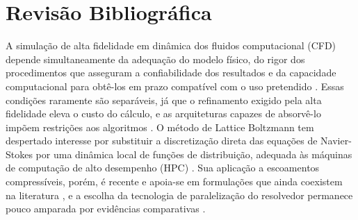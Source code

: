 
\chapter[Revisão Bibliográfica]{Revisão Bibliográfica}\label{ch:revisao-bibliografica}






A simulação de alta fidelidade em dinâmica dos fluidos computacional (CFD) depende simultaneamente da adequação do modelo físico, do rigor dos procedimentos que asseguram a confiabilidade dos resultados e da capacidade computacional para obtê-los em prazo compatível com o uso pretendido \parencite{Moin2011, Oberkampf2010}.
Essas condições raramente são separáveis, já que o refinamento exigido pela alta fidelidade eleva o custo do cálculo, e as arquiteturas capazes de absorvê-lo impõem restrições aos algoritmos \parencite{Karp2025, Kolla2018}.
O método de Lattice Boltzmann tem despertado interesse por substituir a discretização direta das equações de Navier-Stokes por uma dinâmica local de funções de distribuição, adequada às máquinas de computação de alto desempenho (HPC) \parencite{Chen1998, Succi2001, Tomczak2021}.
Sua aplicação a escoamentos compressíveis, porém, é recente e apoia-se em formulações que ainda coexistem na literatura \parencite{Tran2022, Rathnayake2024, Coreixas2017}, e a escolha da tecnologia de paralelização do resolvedor permanece pouco amparada por evidências comparativas \parencite{Davis2023, Martineau2016}.

